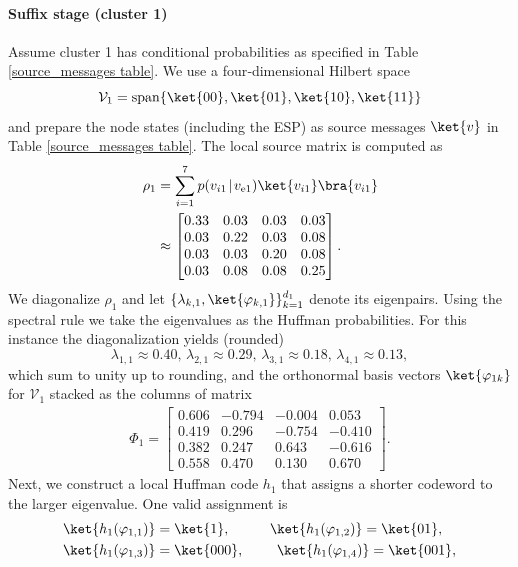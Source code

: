 \documentclass[conference]{IEEEtran}
\begin{document}
\paragraph{Suffix stage (cluster 1)}
Assume cluster 1 has conditional probabilities as specified in Table \ref{source_messages table}. We use a four‑dimensional Hilbert space
\[\mathcal V_1=\mathrm{span}\{\ket{00},\ket{01},\ket{10},\ket{11}\}\]
and prepare the node states (including the ESP) as source messages $\ket{v}$ in Table \ref{source_messages table}. The local source matrix is computed as
\begin{align*}   
\rho_1&=\sum_{i=1}^7 p(v_{i1}\!\mid\!v_{\mathrm e1})\ket{v_{i1}}\bra{v_{i1}} \\
&\approx
\begin{bmatrix}    
0.33 & 0.03 &  0.03 &  0.03 \\
0.03 & 0.22 &  0.03 &  0.08 \\
0.03 & 0.03 &  0.20 &  0.08 \\
0.03 & 0.08 &  0.08 &  0.25 
\end{bmatrix}.
\end{align*}
We diagonalize \(\rho_1\) and let \(\{\lambda_{k,1},\ket{\varphi_{k,1}}\}_{k=1}^{d_1}\) denote its eigenpairs. Using the spectral rule we take the eigenvalues as the Huffman probabilities. For this instance the diagonalization yields (rounded)
\[
\lambda_{1,1}\approx0.40,\, \lambda_{2,1}\approx0.29,\, \lambda_{3,1}\approx0.18,\, \lambda_{4,1}\approx0.13,
\]
which sum to unity up to rounding, and the orthonormal basis vectors $\ket{\varphi_{1k}}$ for $\mathcal{V}_1$ stacked as the columns of matrix 
\begin{align*}
    \Phi_1=
    \begin{bmatrix}
    0.606 &  -0.794 & -0.004 &  0.053 \\
    0.419 &   0.296 & -0.754 & -0.410 \\
    0.382 &   0.247 &  0.643 & -0.616 \\
    0.558 &   0.470 &  0.130 &  0.670
\end{bmatrix}.
\end{align*}
Next, we construct a local Huffman code \(h_1\) that assigns a shorter codeword to the larger eigenvalue. One valid assignment is
\begin{align*}
    &\ket{h_1(\varphi_{1,1})}=\ket{1},\quad &\ket{h_1(\varphi_{1,2})}=\ket{01},\quad \\
    &\ket{h_1(\varphi_{1,3})}=\ket{000},\quad &\ket{h_1(\varphi_{1,4})}=\ket{001},
\end{align*}
\end{document}
